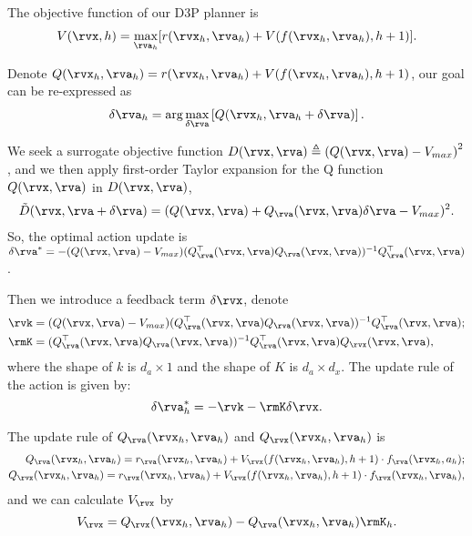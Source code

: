 \documentclass{article} %
\newcommand{\vmax}{V_{max}}
\newcommand{\lijun}[1]{ {#1}}
\begin{document}
The objective function of our D3P planner is 
\begin{align}
\label{eqn:obe2}
    V(\rvx, h) = \max_{\rva_h}[r(\rvx_h, \rva_h) + V(f(\rvx_h, \rva_h), h+1)].
\end{align}

Denote $Q(\rvx_h, \rva_h) =  r(\rvx_h, \rva_h) + V(f(\rvx_h, \rva_h), h+1)$, our goal can be re-expressed as 
\begin{align}
    \lijun{\delta \rva_h} = \arg\max_{\delta \rva}\left[ Q(\rvx_h, \rva_h+\delta \rva) \right].
\end{align}

We seek a surrogate objective function $D(\rvx,\rva) \triangleq \left( Q(\rvx,\rva) -  \vmax \right)^2$, and we then apply first-order Taylor expansion for the Q function $Q(\rvx,\rva)$ in $D(\rvx,\rva)$,
\begin{align}
    \tilde{D}(\rvx,\rva+\delta \rva) = (Q(\rvx,\rva) + Q_\rva(\rvx,\rva)\delta \rva - \vmax)^2.
\end{align}
So, the optimal action update is $\delta \rva^* = -({Q(\rvx,\rva)- \vmax}) (Q_\rva^\top(\rvx,\rva) Q_\rva(\rvx,\rva))^{-1} Q^\top_\rva(\rvx,\rva)$.

Then we introduce a feedback term $\delta \rvx$, denote 
\begin{equation}
    \begin{aligned}
        \rvk&=({Q(\rvx,\rva)- \vmax}) (Q^\top_\rva(\rvx,\rva) Q_\rva(\rvx,\rva))^{-1} Q^\top_\rva(\rvx,\rva); \\
        \rmK&=(Q^\top_\rva(\rvx,\rva) Q_\rva(\rvx,\rva))^{-1} Q^\top_\rva(\rvx,\rva) Q_\rvx(\rvx,\rva),
    \end{aligned}
\end{equation}
where the shape of $k$ is $d_a \times 1$ and the shape of $K$ is $d_a \times d_x$. The update rule of the action is given by:
\begin{equation}
\delta \rva^*_h = -  \rvk -   \rmK \delta \rvx.
\end{equation}

The update rule of $Q_\rva(\rvx_h,\rva_h)$ and $Q_\rvx(\rvx_h,\rva_h)$ is 
\begin{equation}
    \begin{aligned}
            Q_\rva(\rvx_h,\rva_h) = r_\rva(\rvx_h,\rva_h) + V_\rvx(f(\rvx_h,\rva_h), h+1) \cdot f_\rva(\rvx_h, a_h); \\
    Q_\rvx(\rvx_h,\rva_h) = r_\rvx(\rvx_h,\rva_h) + V_\rvx(f(\rvx_h,\rva_h), h+1) \cdot f_\rvx(\rvx_h, \rva_h),
    \end{aligned}
\end{equation}
and we can calculate $V_\rvx$ by 
\begin{equation}
    V_\rvx = Q_\rvx(\rvx_h, \rva_h) - Q_\rva(\rvx_h, \rva_h)\rmK_h.
\end{equation}
\end{document}
